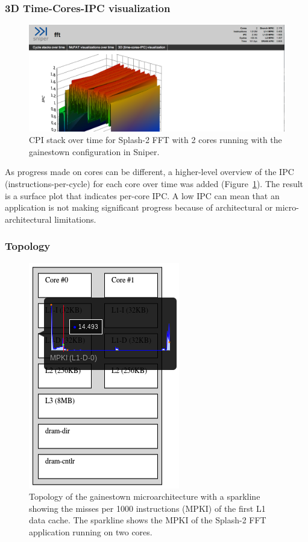 \documentclass[a4paper,11pt,titlepage]{article}
\begin{document}
\subsubsection{3D Time-Cores-IPC visualization}

\begin{figure}\centering
  \includegraphics[width=1.0\linewidth]{fft-2-level3.png}
  \caption{
    \label{fig:fft-level3}
    CPI stack over time for Splash-2 FFT with 2 cores running with the gainestown configuration in Sniper.
}\end{figure}

As progress made on cores can be different, a higher-level overview of the IPC (instructions-per-cycle) for each core over time was added (Figure~\ref{fig:fft-level3}).
The result is a surface plot that indicates per-core IPC.
A low IPC can mean that an application is not making significant progress because of architectural or micro-architectural limitations.

\subsubsection{Topology}

\begin{figure}\centering
  \includegraphics[width=.33\linewidth]{fft-2-topology.png}
  \caption{
    \label{fig:fft-topology}
    Topology of the gainestown microarchitecture with a sparkline showing the misses per 1000 instructions (MPKI) of the first L1 data cache.
    The sparkline shows the MPKI of the Splash-2 FFT application running on two cores.
}\end{figure}
\end{document}
